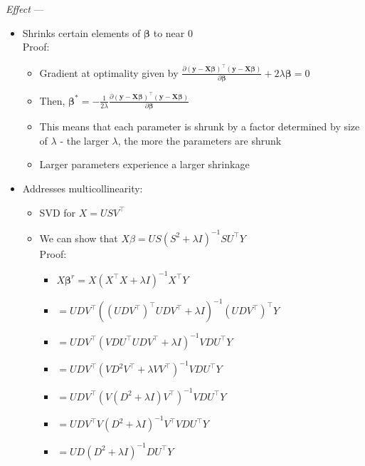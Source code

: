 \emph{Effect} ---
\begin{itemize}
    \item Shrinks certain elements of $\boldsymbol{\beta}$ to near 0\\
    Proof:
    \begin{itemize}
        \item Gradient at optimality given by $\frac{\partial ( \boldsymbol{y} - \boldsymbol{X}\boldsymbol{\beta})^\intercal( \boldsymbol{y} - \boldsymbol{X}\boldsymbol{\beta} )}{\partial \boldsymbol{\beta}} + 2 \lambda \boldsymbol{\beta} = 0$
        \item Then, $\boldsymbol{\beta}^* = -\frac{1}{2 \lambda} \frac{\partial ( \boldsymbol{y} - \boldsymbol{X}\boldsymbol{\beta})^\intercal( \boldsymbol{y} - \boldsymbol{X}\boldsymbol{\beta} )}{\partial \boldsymbol{\beta}}$
        \item This means that each parameter is shrunk by a factor determined by size of $\lambda$ - the larger $\lambda$, the more the parameters are shrunk
        \item Larger parameters experience a larger shrinkage
    \end{itemize}
    \item Addresses multicollinearity:
    \begin{itemize}
        \item SVD for $X = USV^\intercal$
        \item We can show that $X \beta = US\left(S^2 + \lambda I\right)^{-1}SU^\intercal Y$\\
        Proof:
        \begin{itemize}
            \item $X \boldsymbol{\beta}^r = X\left(X^\intercal X + \lambda I\right)^{-1}X^\intercal Y$
            \item $= UDV^\intercal \left((UDV^\intercal)^\intercal UDV^\intercal + \lambda I\right)^{-1}(UDV^\intercal)^\intercal Y$
            \item $= UDV^\intercal \left(VDU^\intercal UDV^\intercal + \lambda I\right)^{-1}VDU^\intercal Y$
            \item $= UDV^\intercal \left(VD^2V^\intercal + \lambda VV^\intercal\right)^{-1}VDU^\intercal Y$
            \item $= UDV^\intercal \left(V(D^2 + \lambda I)V^\intercal\right)^{-1}VDU^\intercal Y$
            \item $= UDV^\intercal V\left(D^2 + \lambda I\right)^{-1}V^\intercal VDU^\intercal Y$
            \item $= UD\left(D^2 + \lambda I\right)^{-1}DU^\intercal Y$

\end{itemize}
\end{itemize}
\end{itemize}
